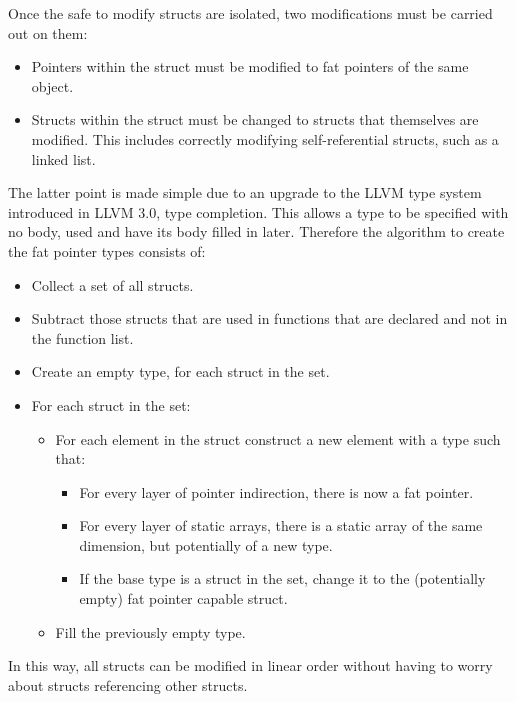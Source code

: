 Once the safe to modify structs are isolated, two modifications must be carried out on them:

\begin{itemize}
\item Pointers within the struct must be modified to fat pointers of the same object.
\item Structs within the struct must be changed to structs that themselves are modified.
This includes correctly modifying self-referential structs, such as a linked list.
\end{itemize}

The latter point is made simple due to an upgrade to the LLVM type system introduced in LLVM 3.0, type completion.
This allows a type to be specified with no body, used and have its body filled in later.
Therefore the algorithm to create the fat pointer types consists of:

\begin{itemize}
\item Collect a set of all structs.
\item Subtract those structs that are used in functions that are declared and not in the function list.
\item Create an empty type, for each struct in the set.
\item For each struct in the set:
\begin{itemize}
\item For each element in the struct construct a new element with a type such that:
\begin{itemize}
\item For every layer of pointer indirection, there is now a fat pointer.
\item For every layer of static arrays, there is a static array of the same dimension, but potentially of a new type.
\item If the base type is a struct in the set, change it to the (potentially empty) fat pointer capable struct.
\end{itemize}
\item Fill the previously empty type.
\end{itemize}
\end{itemize}

In this way, all structs can be modified in linear order without having to worry about structs referencing other structs.
	

